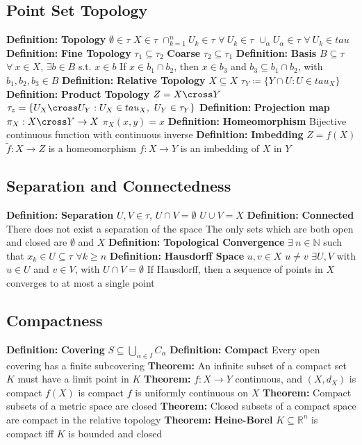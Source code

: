 \documentclass[14pt]{extarticle}
\def\Definition{{\color{blue} \textbf{Definition:} }}
\def\Theorem{{\color{red} \textbf{Theorem:} }}
\begin{document}
\begin{outline}
		\subsection*{Point Set Topology}
			\1	\Definition \textbf{Topology}
				\2	$\emptyset \in \tau$ $X \in \tau$
				\2	$\cap_{k=1}^n U_k \in \tau$ $\forall~U_k \in \tau$
				\2	$\cup_{\alpha} U_{\alpha} \in \tau$ $\forall~U_k \in tau$
			\1 \Definition \textbf{Fine Topology}
				\2	$\tau_1 \subseteq \tau_2$
				\2	\textbf{Coarse} $\tau_2 \subseteq \tau_1$
			\1	\Definition \textbf{Basis}
				\2	$B \subseteq \tau$
				\2	$\forall~x \in X$, $\exists b \in B$ s.t. $x \in b$
				\2	If $x \in b_1 \cap b_2$, then $x \in b_3$ and $b_3 \subseteq b_1 \cap b_2$,
						with $b_1,b_2,b_3 \in B$
			\1	\Definition \textbf{Relative Topology}
				\2	$X \subseteq X$
				\2	$\tau_Y \coloneqq \{Y \cap U : U \in tau_X\}$
			\1	\Definition \textbf{Product Topology}
				\2	$Z = X \cross Y$
				\2	$\tau_z = \{U_X \cross U_Y : U_X \in tau_X,~U_Y \in \tau_Y\}$
			\1	\Definition \textbf{Projection map}
				\2	$\pi_X : X \cross Y \rightarrow X$
				\2	$\pi_X(x,y) = x$
			\1	\Definition \textbf{Homeomorphism}
				\2	Bijective continuous function with continuous inverse
			\1	\Definition \textbf{Imbedding}
				\2	$Z = f(X)$
				\2	$\tilde{f} : X \rightarrow Z$ is a homeomorphism
				\2	$f : X \rightarrow Y$ is an imbedding of $X$ in $Y$
		\subsection*{Separation and Connectedness}
			\1	\Definition \textbf{Separation}
				\2	$U,V \in \tau$, $U \cap V = \emptyset$
				\2	$U \cup V = X$
			\1	\Definition \textbf{Connected}
				\2	There does not exist a separation of the space
				\2	The only sets which are both open and closed are $\emptyset$ and $X$
			\1	\Definition \textbf{Topological Convergence}
				\2	$\exists~n \in \mathbb{N}$ such that $x_k \in U \subseteq \tau$ 
						$\forall k \ge n$
			\1	\Definition \textbf{Hausdorff Space}
				\2	$u,v \in X$ $u \ne v$
				\2	$\exists U,V$ with $u \in U$ and $v \in V$, with $U \cap V = \emptyset$
				\2	If Hausdorff, then a sequence of points in $X$ converges to at most
						a single point
		\subsection*{Compactness}
			\1	\Definition \textbf{Covering}
				\2	$S \subseteq \bigcup_{\alpha \in I} C_{\alpha}$
			\1	\Definition \textbf{Compact}
				\2	Every open covering has a finite subcovering
			\1	\Theorem An infinite subset of a compact set $K$ must have a limit point
					in $K$
			\1	\Theorem $f : X \rightarrow Y$ continuous, and $(X,d_X)$ is compact
				\2	$f(X)$ is compact
				\2	$f$ is uniformly continuous on $X$
			\1	\Theorem Compact subsets of a metric space are closed
			\1	\Theorem Closed subsets of a compact space are compact in the 
					relative topology
			\1	\Theorem \textbf{Heine-Borel}
				\2	$K \subseteq \mathbb{R}^n$ is compact iff $K$ is bounded and closed

\end{outline}
\end{document}
